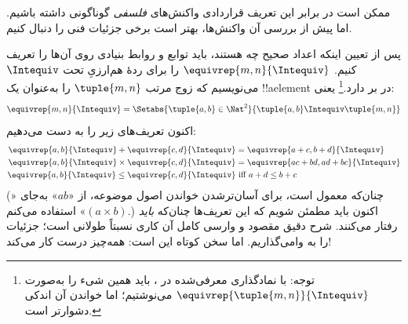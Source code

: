 \documentclass[../../../include/open-logic-section]{subfiles}
\begin{document}
ممکن است در برابر این تعریف قراردادی واکنش‌های \emph{فلسفی} گوناگونی داشته باشیم. اما پیش از بررسی آن واکنش‌ها، بهتر است برخی جزئیات فنی را دنبال کنیم.

پس از تعیین اینکه اعداد صحیح چه هستند، باید توابع و روابط بنیادی روی آن‌ها را تعریف کنیم. $\equivrep{m, n}{\Intequiv}$ را برای ردهٔ هم‌ارزیِ تحت $\Intequiv$ می‌نویسیم که زوج مرتب $\tuple{m, n}$ را به‌عنوان یک !!a{element} در بر دارد.\footnote{توجه: با نمادگذاری معرفی‌شده در ، باید همین شیء را به‌صورت $\equivrep{\tuple{m,n}}{\Intequiv}$ می‌نوشتیم؛ اما خواندن آن اندکی دشوارتر است.} یعنی:
	$$\equivrep{m, n}{\Intequiv} = \Setabs{\tuple{a, b} \in \Nat^2}{\tuple{a, b}\Intequiv \tuple{m, n}}$$
اکنون تعریف‌های زیر را به دست می‌دهیم:
	\begin{align*}
		\equivrep{a, b}{\Intequiv} + \equivrep{c, d}{\Intequiv} &= \equivrep{a + c, b + d}{\Intequiv}\\
		\equivrep{a, b}{\Intequiv} \times \equivrep{c, d}{\Intequiv} &= \equivrep{a c + b  d, a  d + b c}{\Intequiv}\\
		\equivrep{a, b}{\Intequiv} \leq \equivrep{c, d}{\Intequiv} &\text{ iff }a + d \leq b + c
	\end{align*}
(چنان‌که معمول است، برای آسان‌ترشدن خواندن اصول موضوعه، از «$ab$» به‌جای «$(a \times b)$» استفاده می‌کنم.) اکنون باید مطمئن شویم که این تعریف‌ها چنان‌که \emph{باید} رفتار می‌کنند. شرح دقیق مقصود و وارسی کامل آن کاری نسبتاً طولانی است؛ جزئیات را به  وامی‌گذاریم. اما سخن کوتاه این است: همه‌چیز درست کار می‌کند!
\end{document}
